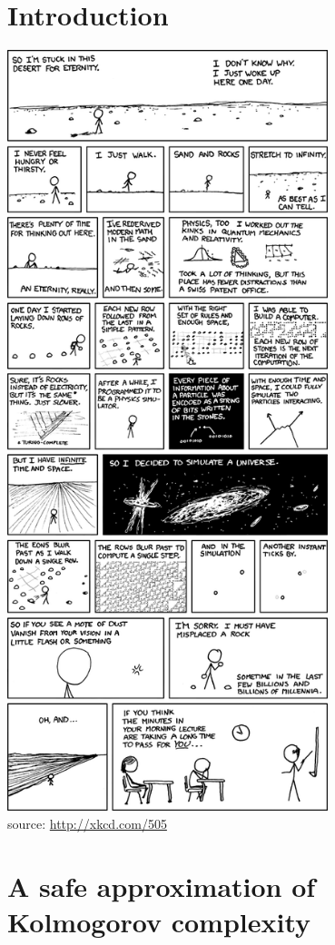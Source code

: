 \documentclass{thesis}
\theoremstyle{definition}
\begin{document}
\chapter{Introduction}
\label{chapter:introduction}


\pagebreak
{
\includegraphics[width=0.7\textwidth]{./images/xkcd.png}\\
{source: \url{http://xkcd.com/505}}
}
\pagebreak

\chapter{A safe approximation of Kolmogorov complexity}
\label{chapter:safe}

\end{document}
